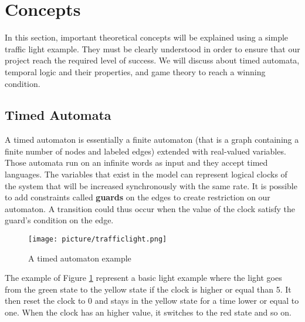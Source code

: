 \section{Concepts}
In this section, important theoretical concepts will be explained using a simple traffic light example. They must be clearly understood in order to ensure that our project reach the required level of success. We will discuss about timed automata, temporal logic and their properties, and game theory to reach a winning condition.

\subsection{Timed Automata} \label{sec:automate}
A timed automaton is essentially a finite automaton (that is a graph
containing a finite number of nodes and labeled edges) extended with real-valued variables. Those automata run on an infinite words as input and they accept timed languages. The variables that exist in the model can represent logical clocks of the system that will be increased synchronously with the same rate.
It is possible to add constraints called \textbf{guards} on the edges to create restriction on our automaton. A transition could thus occur when the value of the clock satisfy the guard's condition on the edge.

\begin{figure}[H]\label{fig:timed}
  \centering
    \texttt{[image: picture/trafficlight.png]}
    \caption{A timed automaton example}
\end{figure}

The example of Figure \ref{fig:timed} represent a basic light example where the light goes from the green state to the yellow state if the clock is higher or equal than 5. It then reset the clock to 0 and stays in the yellow state for a time lower or equal to one. When the clock has an higher value, it switches to the red state and so on.

